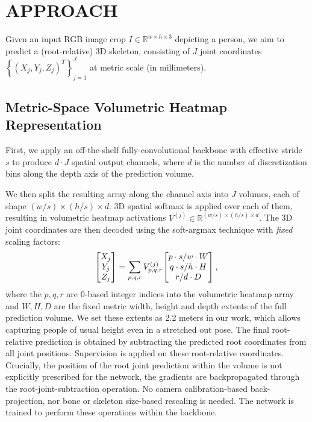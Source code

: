 \section{\uppercase{Approach}}
Given an input RGB image crop $I\in \mathbb{R}^{w\times h\times 3}$ depicting a person, we aim to predict a (root-relative) 3D skeleton, consisting of $J$ joint coordinates $\left\{(X_j, Y_j, Z_j)^T\right\}_{j=1}^{J}$ at metric scale (\ie in millimeters).

\subsection{Metric-Space Volumetric Heatmap Representation}
First, we apply an off-the-shelf fully-convolutional backbone with effective stride $s$ to produce $d\cdot J$ spatial output channels, where $d$ is the number of discretization bins along the depth axis of the prediction volume.

We then split the resulting array along the channel axis into $J$ volumes, each of shape $(w/s) \times (h/s) \times d$.
3D spatial softmax is applied over each of them, resulting in volumetric heatmap activations $V^{(j)} \in \mathbb{R}^{(w/s) \times (h/s) \times d}$.
The 3D joint coordinates are then decoded using the soft-argmax technique with \emph{fixed} scaling factors:
\begin{equation}
\begin{bmatrix}X_j\\ Y_j \\ Z_j \end{bmatrix} = \sum\displaylimits_{p,q,r} V_{p,q,r}^{(j)} \hspace{-0.5mm} \begin{bmatrix} p \cdot s/w \cdot W \\ q \cdot s/h \cdot H \\ r/d \cdot D \end{bmatrix}, \\
\end{equation}
where the $p, q, r$ are 0-based integer indices into the volumetric heatmap array and $W, H, D$ are the fixed metric width, height and depth extents of the full prediction volume.
We set these extents as 2.2 meters in our work, which allows capturing people of usual height even in a stretched out pose.
The final root-relative prediction is obtained by subtracting the predicted root coordinates from all joint positions.
Supervision is applied on these root-relative coordinates.
Crucially, the position of the root joint prediction within the volume is not explicitly prescribed for the network, the gradients are backpropagated through the root-joint-subtraction operation.
No camera calibration-based back-projection, nor bone or skeleton size-based rescaling is needed.
The network is trained to perform these operations within the backbone.
